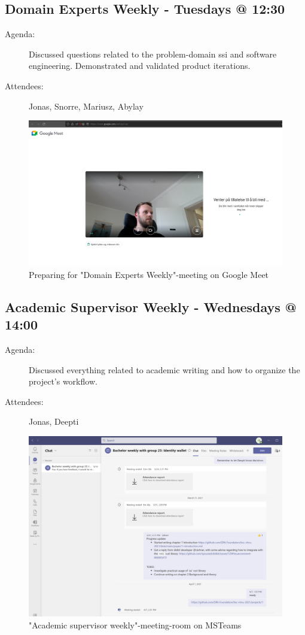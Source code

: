 \subsection{Domain Experts Weekly - Tuesdays @ 12:30}

    \begin{description}
        \item[Agenda:] Discussed questions related to the problem-domain \acrshort{ssi} and software engineering. Demonstrated and validated product iterations.
        \item[Attendees:] Jonas, Snorre, Mariusz, Abylay
    \end{description}

    \begin{figure}[htbp]
      \centering
      \includegraphics[width=.7\textwidth]{figures/googlemeet.png}
      \caption[Meeting domain experts]{Preparing for "Domain Experts Weekly"-meeting on Google Meet}
    \end{figure}
    
\subsection{Academic Supervisor Weekly - Wednesdays @ 14:00}
    
    \begin{description}
        \item[Agenda:] Discussed everything related to academic writing and how to organize the project's workflow.
        \item[Attendees:] Jonas, Deepti
    \end{description}

    \begin{figure}[htbp]
      \centering
      \includegraphics[width=.7\textwidth]{figures/msteams-weekly.png}
      \caption[Meeting academic supervisor]{"Academic supervisor weekly"-meeting-room on MSTeams}
    \end{figure}
    

